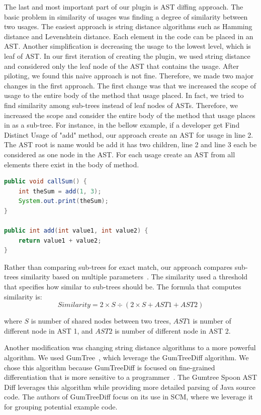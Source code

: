 \documentclass[conference]{IEEEtran}
\begin{document}
The last and most important part of our plugin is AST diffing approach. The basic problem in similarity of usages was finding a degree of similarity between two usages. The easiest approach is string distance algorithms such as Hamming distance and Levenshtein distance. Each element in the code can be placed in an AST. Another simplification is decreasing the usage to the lowest level, which is leaf of AST. In our first iteration of creating the plugin, we used string distance and considered only the leaf node of the AST that contains the usage. After piloting, we found this naive approach is not fine. Therefore, we made two major changes in the first approach. The first change was that we increased the scope of usage to the entire body of the method that usage placed. In fact, we tried to find similarity among sub-trees instead of leaf nodes of ASTs. Therefore, we increased the scope and consider the entire body of the method that usage places in as a sub-tree. For instance, in the bellow example, if a developer get Find Distinct Usage of "add" method, our approach create an AST for usage in line 2. The AST root is name would be add it has two children, line 2 and line 3 each be considered as one node in the AST. For each usage create an AST from all elements there exist in the body of method. \par
\begin{lstlisting}[language=Java, caption=AST exmple is shown. Each AST created based on all elements in the body of method.]
public void callSum() {
    int theSum = add(1, 3);
    System.out.print(theSum);
}

public int add(int value1, int value2) {
    return value1 + value2;
}

\end{lstlisting}


Rather than comparing sub-trees for exact match, our approach compares sub-trees similarity based on multiple parameters~\cite{baxter1998clone}. The similarity used a threshold that specifies how similar to sub-trees should be. The formula that computes similarity is:
\begin{equation}
Similarity = 2 \times S  \div (2  \times S  + AST1 + AST2)
\label{equation1}
\end{equation}

where $S$ is number of shared nodes between two trees, $AST1$ is number of different node in AST 1, and $AST2$ is number of different node in AST 2. \par
Another modification was changing string distance algorithms to a more powerful algorithm. We used GumTree~\cite{baxter1998clone,DBLP:conf/kbse/FalleriMBMM14,falleri2014fine}, which leverage the GumTreeDiff algorithm. We chose this algorithm because GumTreeDiff is focused on fine-grained differentiation that is more sensitive to a programmer~\cite{falleri2014fine}. The Gumtree Spoon AST Diff leverages this algorithm while providing more detailed parsing of Java source code. The authors of GumTreeDiff focus on its use in SCM, where we leverage it for grouping potential example code. \par
\end{document}
